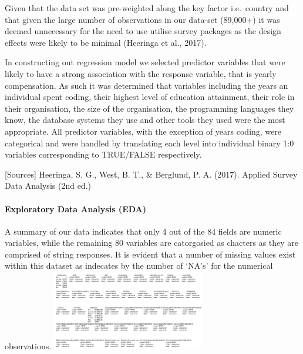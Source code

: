 \documentclass[
  12pt,
]{article}
\begin{document}
Given that the data set was pre-weighted along the key factor
i.e.~country and that given the large number of observations in our
data-set (89,000+) it was deemed unnecessary for the need to use utilise
survey packages as the design effects were likely to be minimal
(Heeringa et al., 2017).

In constructing out regression model we selected predictor variables
that were likely to have a strong association with the response
variable, that is yearly compensation. As such it was determined that
variables including the years an individual spent coding, their highest
level of education attainment, their role in their organisation, the
size of the organisation, the programming languages they know, the
database systems they use and other tools they used were the most
appropriate. All predictor variables, with the exception of years
coding, were categorical and were handled by translating each level into
individual binary 1:0 variables corresponding to TRUE/FALSE
respectively.

{[}Sources{]} Heeringa, S. G., West, B. T., \& Berglund, P. A. (2017).
Applied Survey Data Analysis (2nd ed.)

\hypertarget{exploratory-data-analysis-eda}{%
\paragraph{Exploratory Data Analysis
(EDA)}\label{exploratory-data-analysis-eda}}

A summary of our data indicates that only 4 out of the 84 fields are
numeric variables, while the remaining 80 variables are catorgosied as
chacters as they are comprised of string responses. It is evident that a
number of missing values exist within this dataset as indecates by the
number of `NA's' for the numerical observations.
\includegraphics[width=0.5\textwidth,height=0.5\textheight]{Missing_data.png}
\end{document}
